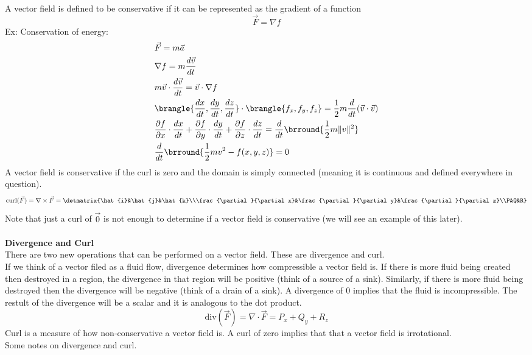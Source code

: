 A vector field is defined to be conservative if it can be represented as the gradient of a function
$$\vec{F}=\nabla f$$
Ex: Conservation of energy:
\begin{align*}
    &\vec{F}=m\vec{a}\\
    &\nabla f=m\frac{d\vec{v}}{dt}\\
    &m\vec{v}\cdot\frac{d\vec{v}}{dt}=\vec{v}\cdot\nabla f\\
    &\brangle{\frac{dx}{dt},\frac{dy}{dt},\frac{dz}{dt}}\cdot\brangle{f_x,f_y,f_z}=\frac{1}{2}m\frac{d}{dt}(\vec{v}\cdot\vec{v})\\
    &\frac{\partial f}{\partial x}\cdot\frac{dx}{dt}+\frac{\partial f}{\partial y}\cdot\frac{dy}{dt}+\frac{\partial f}{\partial z}\cdot\frac{dz}{dt}=\frac{d}{dt}\brround{\frac{1}{2}m\|v\|^2}\\
    &\frac{d}{dt}\brround{\frac{1}{2}mv^2-f(x,y,z)}=0
\end{align*}
A vector field is conservative if the curl is zero and the domain is simply connected (meaning it is continuous and defined everywhere in question).\\
$$\text{curl}(\vec{F})=\nabla\times\vec{F}=\detmatrix{\hat{i}&\hat{j}&\hat{k}\\\frac{\partial}{\partial x}&\frac{\partial}{\partial y}&\frac{\partial}{\partial z}\\P&Q&R}$$
Note that just a curl of $\vec{0}$ is not enough to determine if a vector field is conservative (we will see an example of this later).\\
\\
\textbf{Divergence and Curl}\\
There are two new operations that can be performed on a vector field. These are divergence and curl.\\
If we think of a vector filed as a fluid flow, divergence determines how compressible a vector field is. If there is more fluid being created then destroyed in a region, the divergence in that region will be positive (think of a source of a sink). Similarly, if there is more fluid being destroyed then the divergence will be negative (think of a drain of a sink). A divergence of 0 implies that the fluid is incompressible. The restult of the divergence will be a scalar and it is analogous to the dot product.
$$\text{div}(\vec{F})=\nabla\cdot\vec{F}=P_x+Q_y+R_z$$
Curl is a measure of how non-conservative a vector field is. A curl of zero implies that that a vector field is irrotational.\\
Some notes on divergence and curl.
